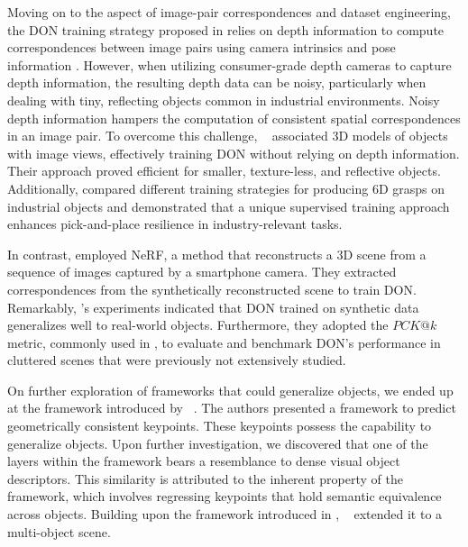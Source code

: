 Moving on to the aspect of image-pair correspondences and dataset engineering,
the DON training strategy proposed in \cite{florence2018dense, florence2020dense} relies on depth information to
compute correspondences between image pairs using camera intrinsics and pose information \cite{hartley2003multiple}.
However, when utilizing consumer-grade depth cameras to capture depth information, the resulting depth data can be noisy,
particularly when dealing with tiny, reflecting objects common in industrial environments. Noisy depth information hampers
the computation of consistent spatial correspondences in an image pair. To overcome this challenge,
\citeauthor{kupcsik2021supervised}~\cite{kupcsik2021supervised} associated 3D models of objects with image views,
effectively training DON without relying on depth information. Their approach proved efficient for smaller,
texture-less, and reflective objects. Additionally, \citeauthor{kupcsik2021supervised}
compared different training strategies for producing 6D grasps on industrial objects and
demonstrated that a unique supervised training approach enhances pick-and-place resilience in industry-relevant tasks.

In contrast, \citeauthor{nerf-Supervision}\cite{nerf-Supervision} employed NeRF\cite{mildenhall2021nerf},
a method that reconstructs a 3D scene from a sequence of images captured by a smartphone camera.
They extracted correspondences from the synthetically reconstructed scene to train DON. Remarkably,
\citeauthor{adrian2022efficient}'s experiments indicated that DON trained on synthetic data generalizes
well to real-world objects. Furthermore, they adopted the $PCK@k$ metric, commonly used in
\parencites{chai2019multi}{fathy2018hierarchical}, to evaluate and benchmark DON's performance
in cluttered scenes that were previously not extensively studied.

On further exploration of frameworks that could generalize objects,
we ended up at the framework introduced by \citeauthor{suwajanakorn2018discovery}~\cite{suwajanakorn2018discovery}.
The authors presented a framework to predict geometrically consistent keypoints.
These keypoints possess the capability to generalize objects.
Upon further investigation, we discovered that one of the layers within the framework bears a resemblance
to dense visual object descriptors. This similarity is attributed to the inherent property of the framework,
which involves regressing keypoints that hold semantic equivalence across objects.
Building upon the framework introduced in \cite{suwajanakorn2018discovery}, ~\cite{zhao2020learning}
extended it to a multi-object scene.

